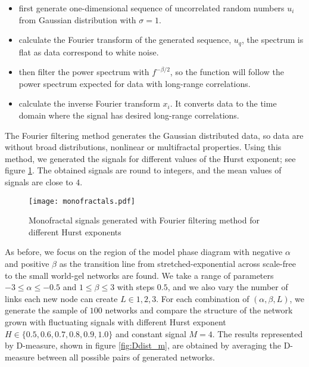 \begin{itemize}
	\item first generate one-dimensional sequence of uncorrelated random numbers $u_i$ from Gaussian distribution with $\sigma=1$.
	\item calculate the Fourier transform of the generated sequence, $u_q$, the spectrum is flat as data correspond to white noise.
	\item then filter the power spectrum with $f^{-\beta/2}$, so the function will follow the power spectrum expected for data with long-range correlations. 	
	\item  calculate the inverse Fourier transform $x_i$. It converts data to the time domain where the signal has desired long-range correlations.
	
\end{itemize}     

The Fourier filtering method generates the Gaussian distributed data, so data are without broad distributions, nonlinear or multifractal properties. Using this method, we generated the signals for different values of the Hurst exponent; see figure \ref{fig:monofractals}. The obtained signals are round to integers, and the mean values of signals are close to $4$.

\begin{figure}[ht!]
	\centering
	\texttt{[image: monofractals.pdf]}
	\caption[Long range correlated monofractal signals]{Monofractal signals generated with Fourier filtering method for different Hurst exponents}
	\label{fig:monofractals}
\end{figure}  


As before, we focus on the region of the model phase diagram with negative $\alpha$ and positive $\beta$ as the transition line from stretched-exponential across scale-free to the small world-gel networks are found. We take a range of parameters  $-3\leq\alpha\leq-0.5$ and $1\leq\beta\leq3$ with steps $0.5$, and we also vary the number of links each new node can create $L\in{1, 2, 3}$. For each combination of $(\alpha, \beta, L)$, we generate the sample of $100$ networks and compare the structure of the network grown with fluctuating signals with different Hurst exponent $H \in \{0.5, 0.6, 0.7, 0.8, 0.9, 1.0\}$ and constant signal $M=4$. The results represented by D-measure, shown in figure \ref{fig:Ddist_m}, are obtained by averaging the D-measure between all possible pairs of generated networks.   

